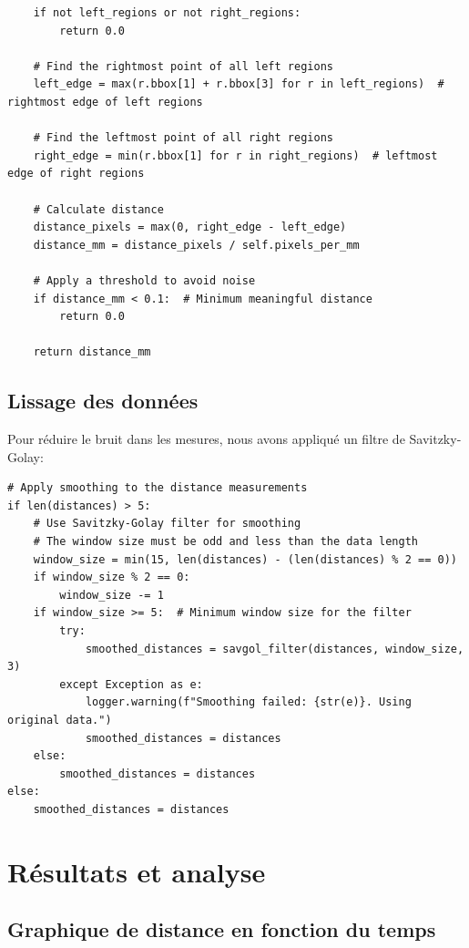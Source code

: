 \documentclass[12pt,a4paper]{article}
\begin{document}
\begin{lstlisting}
    if not left_regions or not right_regions:
        return 0.0
        
    # Find the rightmost point of all left regions
    left_edge = max(r.bbox[1] + r.bbox[3] for r in left_regions)  # rightmost edge of left regions
    
    # Find the leftmost point of all right regions
    right_edge = min(r.bbox[1] for r in right_regions)  # leftmost edge of right regions
    
    # Calculate distance
    distance_pixels = max(0, right_edge - left_edge)
    distance_mm = distance_pixels / self.pixels_per_mm
    
    # Apply a threshold to avoid noise
    if distance_mm < 0.1:  # Minimum meaningful distance
        return 0.0
        
    return distance_mm
\end{lstlisting}

\subsection{Lissage des données}

Pour réduire le bruit dans les mesures, nous avons appliqué un filtre de Savitzky-Golay:

\begin{lstlisting}
# Apply smoothing to the distance measurements
if len(distances) > 5:
    # Use Savitzky-Golay filter for smoothing
    # The window size must be odd and less than the data length
    window_size = min(15, len(distances) - (len(distances) % 2 == 0))
    if window_size % 2 == 0:
        window_size -= 1
    if window_size >= 5:  # Minimum window size for the filter
        try:
            smoothed_distances = savgol_filter(distances, window_size, 3)
        except Exception as e:
            logger.warning(f"Smoothing failed: {str(e)}. Using original data.")
            smoothed_distances = distances
    else:
        smoothed_distances = distances
else:
    smoothed_distances = distances
\end{lstlisting}

\section{Résultats et analyse}

\subsection{Graphique de distance en fonction du temps}
\end{document}
